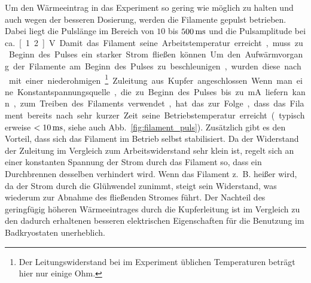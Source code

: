 Um den Wärmeeintrag in das Experiment so gering wie möglich zu halten und auch wegen der besseren Dosierung, werden die Filamente gepulst betrieben. Dabei liegt die Pulslänge im Bereich von $10$ bis $\unit[500]{ms}$ und die Pulsamplitude bei ca.\ \unit[1.2]{V}. Damit das Filament seine Arbeitstemperatur erreicht, muss zu Beginn des Pulses ein starker Strom fließen können. Um den Aufwärmvorgang der Filamente am Beginn des Pulses zu beschleunigen, wurden diese nach \cite{kimitoshi} mit einer niederohmigen\footnote{
Der Leitungswiderstand bei im Experiment üblichen Temperaturen beträgt hier nur einige Ohm.} Zuleitung aus Kupfer angeschlossen. Wenn man eine Konstantspannungsquelle, die zu Beginn des Pulses bis zu \unit[100]{mA} liefern kann, zum Treiben des Filaments verwendet, hat das zur Folge, dass das Filament bereits nach sehr kurzer Zeit seine Betriebstemperatur erreicht (typischerweise $<\unit[10]{ms}$, siehe auch Abb.~\ref{fig:filament_puls}). Zusätzlich gibt es den Vorteil, dass sich das Filament im Betrieb selbst stabilisiert. Da der Widerstand der Zuleitung im Vergleich zum Arbeitswiderstand sehr klein ist, regelt sich an einer konstanten Spannung der Strom durch das Filament so, dass ein Durchbrennen desselben verhindert wird. Wenn das Filament z.\ B. heißer wird, da der Strom durch die Glühwendel zunimmt, steigt sein Widerstand, was wiederum zur Abnahme des fließenden Stromes führt. Der Nachteil des geringfügig höheren Wärmeeintrages durch die Kupferleitung ist im Vergleich zu den dadurch erhaltenen besseren elektrischen Eigenschaften für die Benutzung im Badkryostaten unerheblich.

